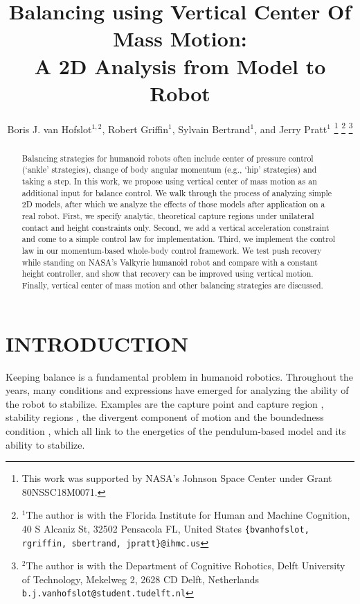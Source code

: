 \documentclass[letterpaper, 10 pt, conference]{ieeeconf}  %
\title{\LARGE \bf
Balancing using Vertical Center Of Mass Motion: \\ A 2D Analysis from Model to Robot
}
\author{Boris J. van Hofslot$^{1,2}$, Robert Griffin$^1$, Sylvain Bertrand$^1$, and Jerry Pratt$^1$%
\thanks{This work was supported by NASA's Johnson Space Center under Grant 80NSSC18M0071.}%
\thanks{$^{1}$The author is with the Florida Institute for Human and Machine Cognition, 40 S Alcaniz St, 32502 Pensacola FL, United States
        {\tt\small \{bvanhofslot, rgriffin, sbertrand, jpratt\}@ihmc.us}}%
\thanks{$^{2}$The author is with the Department of Cognitive Robotics, Delft University of Technology, Mekelweg 2, 2628 CD Delft, Netherlands
        {\tt\small b.j.vanhofslot@student.tudelft.nl}}%
}
\begin{document}
\maketitle
\thispagestyle{empty}
\pagestyle{empty}



\begin{abstract}
Balancing strategies for humanoid robots often include center of pressure control (`ankle' strategies), change of body angular momentum (e.g., `hip' strategies) and taking a step. In this work, we propose using vertical center of mass motion as an additional input for balance control. We walk through the process of analyzing simple 2D models, after which we analyze the effects of those models after application on a real robot. First, we specify analytic, theoretical capture regions under unilateral contact and height constraints only. Second, we add a vertical acceleration constraint and come to a simple control law for implementation. Third, we implement the control law in our momentum-based whole-body control framework. We test push recovery while standing on NASA's Valkyrie humanoid robot and compare with a constant height controller, and show that recovery can be improved using vertical motion. Finally, vertical center of mass motion and other balancing strategies are discussed.
\end{abstract}



\section{INTRODUCTION}
Keeping balance is a fundamental problem in humanoid robotics. Throughout the years, many conditions and expressions have emerged for analyzing the ability of the robot to stabilize. Examples are the capture point and capture region \cite{pratt2006capture, koolen2012capturability}, stability regions \cite{stephens2007humanoid}, the divergent component of motion \cite{takenaka2009real} and the boundedness condition \cite{lanari2014boundedness}, which all link to the energetics of the pendulum-based model and its ability to stabilize.
\end{document}
